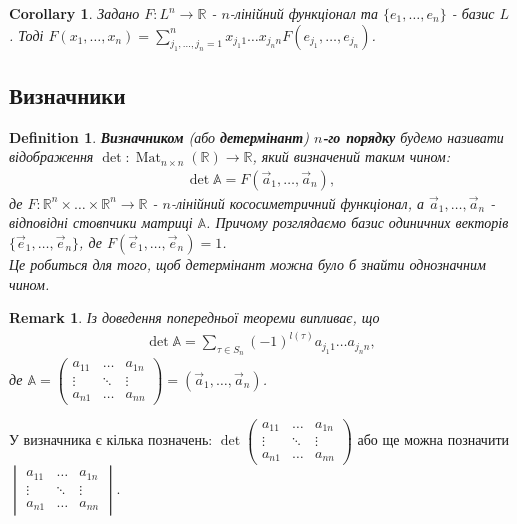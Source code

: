 \documentclass[a4paper, 10pt]{article}
\theoremstyle{theoremdd}
\newtheorem{definition}[theorem]{Definition}
\newtheorem{remark}[theorem]{Remark}
\newtheorem{corollary}[theorem]{Corollary}
\DeclareMathOperator{\Mat}{Mat}
\begin{document}
\begin{corollary}
Задано $F \colon L^n \to \mathbb{R}$ - $n$-лінійний функціонал та $\{e_1,\dots,e_n\}$ - базис $L$. Тоді $F(x_1,\dots,x_n) = \displaystyle\sum_{j_1,\dots,j_n=1}^n x_{j_1 1}\dots x_{j_n n} F(e_{j_1},\dots,e_{j_n})$.
\end{corollary}

\subsection{Визначники}
\begin{definition}
\textbf{Визначником} (або \textbf{детермінант}) \textbf{$n$-го порядку} будемо називати відображення $\det \colon \Mat_{n \times n}(\mathbb{R}) \to \mathbb{R}$, який визначений таким чином:
\begin{align*}
\det \mathbb{A} = F(\vec{a}_1,\dots,\vec{a}_n),
\end{align*}
де $F \colon \mathbb{R}^n \times \dots \times \mathbb{R}^n \to \mathbb{R}$ - $n$-лінійний кососиметричний функціонал, а $\vec{a}_1,\dots,\vec{a}_n$ - відповідні стовпчики матриці $\mathbb{A}$. Причому розглядаємо базис одиничних векторів $\{\vec{e}_1,\dots, \vec{e}_n\}$, де $F(\vec{e}_1,\dots,\vec{e}_n) = 1$.\\
\textit{Це робиться для того, щоб детермінант можна було б знайти однозначним чином.}
\end{definition}

\begin{remark}
Із доведення попередньої теореми випливає, що
\begin{align*}
\det \mathbb{A} = \displaystyle \sum_{\tau \in S_n} (-1)^{l(\tau)} a_{j_1 1}\dots a_{j_n n},
\end{align*}
де $\mathbb{A} = \begin{pmatrix}
 a_{11} & \dots & a_{1n} \\
 \vdots & \ddots &\vdots \\
 a_{n1} & \dots & a_{nn}
\end{pmatrix} = (\vec{a}_1, \dots, \vec{a}_n)$.
\end{remark}
\noindent
У визначника є кілька позначень: $\det \begin{pmatrix}
a_{11} & \dots & a_{1n} \\
 \vdots & \ddots &\vdots \\
 a_{n1} & \dots & a_{nn}
\end{pmatrix}$ або ще можна позначити $\begin{vmatrix}
a_{11} & \dots & a_{1n} \\
 \vdots & \ddots &\vdots \\
 a_{n1} & \dots & a_{nn}
\end{vmatrix}$.
\end{document}
